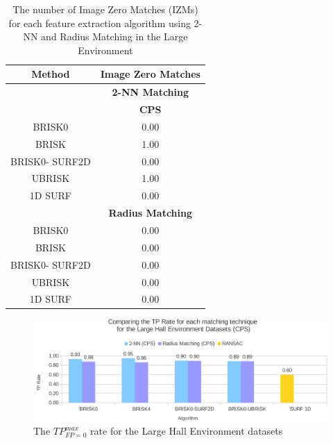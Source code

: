 \documentclass[11pt]{report}
\begin{document}
\begin{table}
\caption{The number of Image Zero Matches (IZMs) for each feature extraction
algorithm using 2-NN and Radius Matching in the Large Environment}


\begin{tabular}{|c|c|}
\hline 
\textbf{Method} & \multicolumn{1}{c|}{\textbf{Image Zero Matches}}\tabularnewline
\hline 
 & \multicolumn{1}{c|}{\textbf{2-NN Matching}}\tabularnewline
\hline 
 & \textbf{CPS}\tabularnewline
\hline 
\hline 
BRISK0 & 0.00\tabularnewline
\hline 
BRISK & 1.00\tabularnewline
\hline 
BRISK0- SURF2D & 0.00\tabularnewline
\hline 
UBRISK & 1.00\tabularnewline
\hline 
1D SURF & 0.00\tabularnewline
\hline 
 & \multicolumn{1}{c|}{\textbf{Radius Matching}}\tabularnewline
\hline 
BRISK0 & 0.00\tabularnewline
\hline 
BRISK & 0.00\tabularnewline
\hline 
BRISK0- SURF2D & 0.00\tabularnewline
\hline 
UBRISK & 0.00\tabularnewline
\hline 
1D SURF & 0.00\tabularnewline
\hline 
\end{tabular}
\label{app:lh_izm}
\end{table}


\begin{figure}
  \centering
    \includegraphics[width=1.0\textwidth]{../Drawings/Graphs/tp_rate_lh_cps.pdf}
    \caption{The $TP_{FP=0}^{max}$ rate for the Large Hall Environment datasets} 
    \label{app:tp_rate_lh}
\end{figure}

%
 
\end{document}

